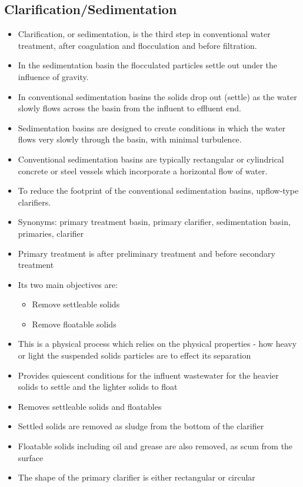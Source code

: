 \subsection{Clarification/Sedimentation}
\begin{itemize}
\item Clarification, or sedimentation, is the third step in conventional water treatment, after coagulation and flocculation and before filtration.
\item In the sedimentation basin the flocculated particles settle out under the influence of gravity.
\item In conventional sedimentation basins the solids drop out (settle) as the water slowly flows across the basin from the influent to effluent end.
\item Sedimentation basins are designed to create conditions in which the water flows very slowly through the basin, with minimal turbulence.
\item Conventional sedimentation basins are typically rectangular or cylindrical concrete or steel vessels which incorporate a horizontal flow of water.
\item To reduce the footprint of the conventional sedimentation basins, upflow-type clarifiers.
\item Synonyms:  primary treatment basin, primary clarifier, sedimentation basin, primaries, clarifier

	
		\item Primary treatment is after preliminary treatment and 				before secondary treatment
		\item Its two main objectives are: 
			\begin{itemize}
				\item Remove settleable solids
				\item Remove floatable solids
			\end{itemize}
		\item This is a physical process which relies on the physical 			properties - how heavy or light the suspended solids particles 		are to effect its separation
		\item Provides quiescent conditions for the influent 					wastewater for the heavier solids to settle and the lighter 			solids to float
		\item Removes settleable solids and floatables
		\item Settled solids are removed as sludge from the bottom of 			the clarifier
		\item Floatable solids including oil and grease are also 				removed, as scum from the surface\\
		\item The shape of the primary clarifier is either rectangular 		or circular
	

\end{itemize}
